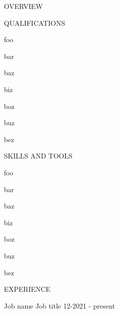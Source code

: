 \documentclass{resume}
\begin{document}
    \heading

    \MakeUppercase{\huge overview}
    
    \lipsum[1]

    \MakeUppercase{\huge qualifications}
    \begin{list}{*}
        \item foo
        \item bar
        \item baz
        \item biz
        \item boz
        \item buz
        \item bez
    \end{list}

    \MakeUppercase{\huge skills and tools}

    \begin{list}{*}
        \item foo
        \item bar
        \item baz
        \item biz
        \item boz
        \item buz
        \item bez
    \end{list}

    \MakeUppercase{\huge experience}
    
    Job name
    Job title
    12-2021 - present

    \lipsum[2]
\end{document}
